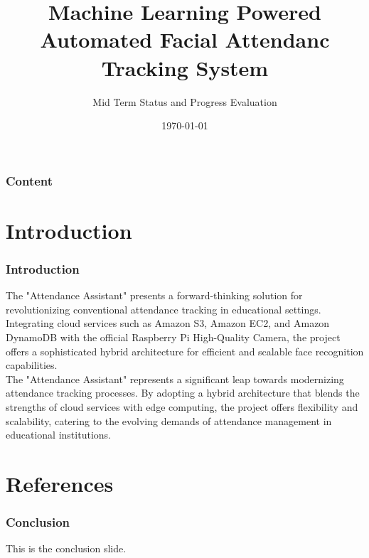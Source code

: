 \documentclass[aspectratio=169]{beamer}
\title{Machine Learning Powered Automated Facial Attendanc Tracking System}
\author{Mid Term Status and Progress Evaluation}
\date{\today}
\begin{document}
\begin{frame}
	\titlepage
\end{frame}

\begin{frame}
	\frametitle{Content}
	\tableofcontents
\end{frame}

\section{Introduction}
\begin{frame}
	\centering
	\frametitle{Introduction}
	\begin{minipage}{0.95\textwidth}
		The "Attendance Assistant" presents a forward-thinking solution for revolutionizing conventional attendance tracking in educational settings. Integrating cloud services such as Amazon S3, Amazon EC2, and Amazon DynamoDB with the official Raspberry Pi High-Quality Camera, the project offers a sophisticated hybrid architecture for efficient and scalable face recognition capabilities.\\
		\vspace{0.5cm}
		The "Attendance Assistant" represents a significant leap towards modernizing attendance tracking processes. By adopting a hybrid architecture that blends the strengths of cloud services with edge computing, the project offers flexibility and scalability, catering to the evolving demands of attendance management in educational institutions.
	\end{minipage}
\end{frame}

\section{References}
\begin{frame}
	\frametitle{Conclusion}
	This is the conclusion slide.
\end{frame}
\end{document}

